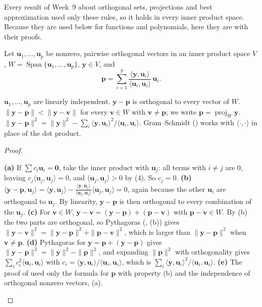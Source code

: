 \documentclass[10pt]{scrartcl}
\newcommand{\vv}[1]{\mathbf{#1}}
\newcommand{\ip}[2]{\langle #1,#2\rangle}
\DeclareMathOperator{\spn}{Span}\DeclareMathOperator{\Nul}{Nul}\DeclareMathOperator{\Col}{Col}\DeclareMathOperator{\Row}{Row}\DeclareMathOperator{\tr}{tr}\DeclareMathOperator{\proj}{proj}\DeclareMathOperator{\dist}{dist}
\begin{document}
Every result of Week~9 about orthogonal sets, projections and best approximation used only these rules, so it holds in every inner product space. Because they are used below for functions and polynomials, here they are with their proofs.

\begin{proposition*}
  Let $\vv u_1,\dots,\vv u_p$ be nonzero, pairwise orthogonal vectors in an inner product space $V$, $W=\spn\{\vv u_1,\dots,\vv u_p\}$, $\vv y\in V$, and
  \[
    \vv p=\sum_{i=1}^p\frac{\ip{\vv y}{\vv u_i}}{\ip{\vv u_i}{\vv u_i}}\,\vv u_i .
  \]
  \begin{enumerate}
    \ii[(a)] $\vv u_1,\dots,\vv u_p$ are linearly independent.
    \ii[(b)] $\vv y-\vv p$ is orthogonal to every vector of $W$.
    \ii[(c)] $\|\vv y-\vv p\|<\|\vv y-\vv v\|$ for every $\vv v\in W$ with $\vv v\neq\vv p$; we write $\vv p=\proj_W\vv y$.
    \ii[(d)] $\|\vv y-\vv p\|^2=\|\vv y\|^2-\sum_i\ip{\vv y}{\vv u_i}^2/\ip{\vv u_i}{\vv u_i}$.
    \ii[(e)] Gram--Schmidt () works with $\ip{\cdot}{\cdot}$ in place of the dot product.
  \end{enumerate}
\end{proposition*}
\begin{proof}
  \begin{steps}
    \ii \textbf{(a)} If $\sum c_i\vv u_i=\vv 0$, take the inner product with $\vv u_j$: all terms with $i\neq j$ are $0$, leaving $c_j\ip{\vv u_j}{\vv u_j}=0$, and $\ip{\vv u_j}{\vv u_j}>0$ by (4). So $c_j=0$.
    \ii \textbf{(b)} $\ip{\vv y-\vv p}{\vv u_j}=\ip{\vv y}{\vv u_j}-\frac{\ip{\vv y}{\vv u_j}}{\ip{\vv u_j}{\vv u_j}}\ip{\vv u_j}{\vv u_j}=0$, again because the other $\vv u_i$ are orthogonal to $\vv u_j$. By linearity, $\vv y-\vv p$ is then orthogonal to every combination of the $\vv u_j$.
    \ii \textbf{(c)} For $\vv v\in W$, $\vv y-\vv v=(\vv y-\vv p)+(\vv p-\vv v)$ with $\vv p-\vv v\in W$. By (b) the two parts are orthogonal, so Pythagoras (, (b)) gives $\|\vv y-\vv v\|^2=\|\vv y-\vv p\|^2+\|\vv p-\vv v\|^2$, which is larger than $\|\vv y-\vv p\|^2$ when $\vv v\neq\vv p$.
    \ii \textbf{(d)} Pythagoras for $\vv y=\vv p+(\vv y-\vv p)$ gives $\|\vv y-\vv p\|^2=\|\vv y\|^2-\|\vv p\|^2$, and expanding $\|\vv p\|^2$ with orthogonality gives $\sum_i c_i^2\ip{\vv u_i}{\vv u_i}$ with $c_i=\ip{\vv y}{\vv u_i}/\ip{\vv u_i}{\vv u_i}$, which is $\sum_i\ip{\vv y}{\vv u_i}^2/\ip{\vv u_i}{\vv u_i}$.
    \ii \textbf{(e)} The proof of  used only the formula for $\vv p$ with property (b) and the independence of orthogonal nonzero vectors, (a). \qedhere
  \end{steps}
\end{proof}
\end{document}
